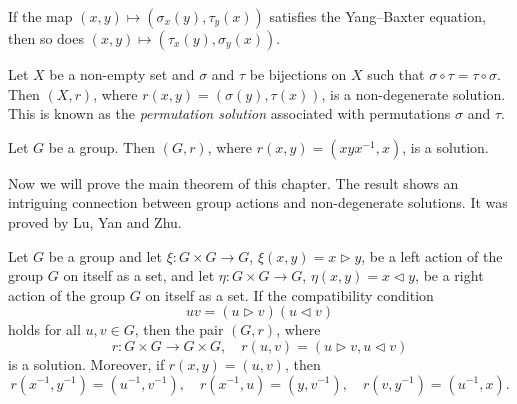 \begin{example}
If the map $(x,y)\mapsto(\sigma_x(y),\tau_y(x))$ satisfies the Yang--Baxter equation, then 
so does $(x,y)\mapsto (\tau_x(y),\sigma_y(x))$. 
\end{example}

\begin{example}
\label{exa:Lyubashenko}
Let $X$ be a non-empty set and $\sigma$ and $\tau$ be 
bijections on $X$ such that $\sigma\circ\tau=\tau\circ\sigma$. Then 
$(X,r)$, where $r(x,y)=(\sigma(y),\tau(x))$, is a non-degenerate solution. 
This is known as the \emph{permutation solution} associated
with permutations $\sigma$ and $\tau$. 
\end{example}
%

\begin{example}
\label{exa:Venkov}
Let $G$ be a group. Then $(G,r)$, where $r(x,y)=(xyx^{-1},x)$, is a solution. 
\end{example}

Now we will prove the main theorem of this chapter. The result
shows an intriguing connection 
between group actions and non-degenerate solutions. It 
was proved by Lu, Yan and Zhu. 

\begin{theorem}
\label{thm:LYZ}
Let $G$ be a group and let $\xi\colon G\times G\to G$, $\xi(x,y)=x\rhd y$,
be a left action of the group $G$ on itself as a set, and 
let $\eta\colon G\times G\to G$, $\eta(x,y)=x\lhd y$, 
be a right action of the group $G$ on itself as a set. If the compatibility condition
\[
uv=(u\rhd v)(u\lhd v)
\]
holds for all $u,v\in G$, then the pair $(G,r)$, where 
\[
r\colon G\times G\to G\times G,\quad
r(u,v)=(u\rhd v,u\lhd v)
\]
is a solution. Moreover, 
if $r(x,y)=(u,v)$, then 
\[
r(x^{-1},y^{-1})=(u^{-1},v^{-1}),
\quad
r(x^{-1},u)=(y,v^{-1}),
\quad
r(v,y^{-1})=(u^{-1},x).
\]
\end{theorem}

